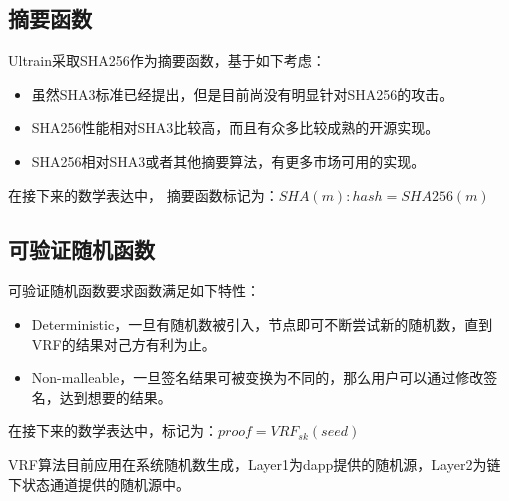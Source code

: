 \documentclass[12pt, UTF8]{article}
\begin{document}
\subsection{摘要函数}
Ultrain采取SHA256作为摘要函数，基于如下考虑：
\begin{itemize}
\item 虽然SHA3标准已经提出，但是目前尚没有明显针对SHA256的攻击。
\item SHA256性能相对SHA3比较高，而且有众多比较成熟的开源实现。
\item SHA256相对SHA3或者其他摘要算法，有更多市场可用的实现。
\end{itemize}

在接下来的数学表达中，
摘要函数标记为：$SHA(m): hash = SHA256(m)$

\subsection{可验证随机函数}
\begin{comment}
密码学主要采用高速，高安全性的成熟密码学算法
VRF\cite{micali1999verifiable}有两种选择
\begin{itemize}
\item 类似Algorand中的选择，采用non-mallable签名
\item ED25519，但是为了保证non-mallable，我们采用了限制密文格式，比如要求高位为0；但是这个限制有可能影响我们的随机选择时候的公平性
\end{itemize}
\end{comment}

可验证随机函数要求函数满足如下特性：
\begin{itemize}
\item Deterministic，一旦有随机数被引入，节点即可不断尝试新的随机数，直到VRF的结果对己方有利为止。
\item Non-malleable，一旦签名结果可被变换为不同的，那么用户可以通过修改签名，达到想要的结果。
\end{itemize}

在接下来的数学表达中，标记为：$proof= VRF_{sk} (seed)$

VRF算法目前应用在系统随机数生成\cite{githubrandgen}，Layer1为dapp提供的随机源，Layer2为链下状态通道提供的随机源中\cite{gitlayer2rand}。
\end{document}
